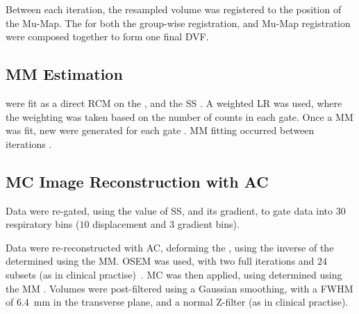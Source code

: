         Between each iteration, the resampled volume was registered to the position of the \gls{Mu-Map}. The  for both the group-wise registration, and \gls{Mu-Map} registration were composed together to form one final \gls{DVF}.%
    
    
    \subsection{\acrlong{MM} Estimation} \label{sec:motion_model_estimation}
         were fit as a direct \acrlong{RCM} on the , %
        and the \gls{SS}%
        . A weighted \acrlong{LR} was used, where the weighting was taken based on the number of counts in each gate. Once a \gls{MM} was fit, new  were generated for each gate%
        . \gls{MM} fitting occurred between iterations%
        .
    
    
    \subsection{\gls{MC} Image Reconstruction with \gls{AC}} \label{sec:mc_image_reconstruction_with_ac}
        Data were re-gated, using the value of \gls{SS}, and its gradient, to gate data into $30$ respiratory bins ($10$ displacement and $3$ gradient bins).
        
        Data were re-reconstructed with \gls{AC}, deforming the , using the inverse of the  determined using the \gls{MM}. %
        \acrshort{OSEM} was used, with two full iterations and $24$ subsets (as in clinical practise)~\cite{Hudson1994}. \gls{MC} was then applied, using  determined using the \gls{MM}%
        . Volumes were post-filtered using a Gaussian smoothing, with a \acrshort{FWHM} of \SI{6.4}{\milli\metre} in the transverse plane, and a normal Z-filter (as in clinical practise).
    
